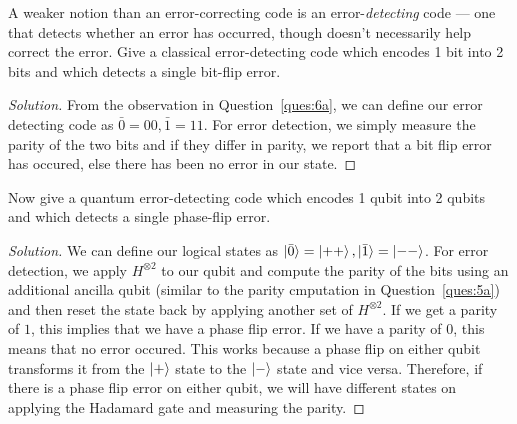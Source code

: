 \begin{solution}[label=ques:6b]
  \begin{question}
    A weaker notion than an error-correcting code is an
error-\textit{detecting} code --- one that detects whether an error has
occurred, though doesn't necessarily help correct the error.  Give a
classical error-detecting code which encodes 1 bit into 2 bits and
which detects a single bit-flip error.
  \end{question}
  \tcblower{}
  \begin{proof}[Solution]
    From the observation in Question~\ref{ques:6a}, we can define our error detecting code as $\bar{0} = 00, \bar{1} = 11$. For error detection, we simply measure the parity of the two bits and if they differ in parity, we report that a bit flip error has occured, else there has been no error in our state.
  \end{proof}
\end{solution}

\begin{solution}[label=ques:6c]
  \begin{question}
    Now give a quantum error-detecting code which encodes 1 qubit
into 2 qubits and which detects a single phase-flip error.
  \end{question}
  \tcblower{}
  \begin{proof}[Solution]
    We can define our logical states as $\ket{\bar{0}} = \ket{++}, \ket{\bar{1}} = \ket{--}$. For error detection, we apply $H^{\otimes 2}$ to our qubit and compute the parity of the bits using an additional ancilla qubit (similar to the parity cmputation in Question~\ref{ques:5a}) and then reset the state back by applying another set of $H^{\otimes 2}$. If we get a parity of $1$, this implies that we have a phase flip error. If we have a parity of $0$, this means that no error occured. This works because a phase flip on either qubit transforms it from the $\ket{+}$ state to the $\ket{-}$ state and vice versa. Therefore, if there is a phase flip error on either qubit, we will have different states on applying the Hadamard gate and measuring the parity.
  \end{proof}
\end{solution}


